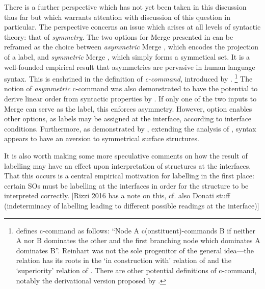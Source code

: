 There is a further perspective which has not yet been taken in this discussion thus far but which warrants attention with discussion of this question in particular. The perspective concerns an issue which arises at all levels of syntactic theory: that of \textit{symmetry}. The two options for Merge presented in  can be reframed as the choice between \textit{asymmetric} Merge , which encodes the projection of a label, and \textit{symmetric} Merge , which simply forms a symmetical set. It is a well-founded empirical result that asymmetries are pervasive in human language syntax. This is enshrined in the definition of \textit{c-command}, introduced by \textcite{ReinhartT_1976}.%
\footnote{\label{fn:c-command}\textcite[32]{ReinhartT_1976} defines c-command as follows: ``Node A c(onstituent)-commands B if neither A nor B dominates the other and the first branching node which dominates A dominates B''. Reinhart was not the sole progenitor of the general idea---the relation has its roots in the `in construction with' relation of \textcite{KlimaES_1964} and the `superiority' relation of \textcite{ChomskyN_1973}. There are other potential definitions of c-command, notably the derivational version proposed by \textcite{EpsteinSD.etal_1998}.}
The notion of \textit{asymmetric} c-command was also demonstrated to have the potential to derive linear order from syntactic properties by \textcite{KayneRS_1994}.
If only one of the two inputs to Merge can serve as the label, this enforces asymmetry. However, option  enables other options, as labels may be assigned at the interface, according to interface conditions. Furthermore, as demonstrated by \textcite{MoroA_2000}, extending the analysis of \textcite{KayneRS_1994}, syntax appears to have an aversion to symmetrical surface structures.

It is also worth making some more speculative comments on how the result of labelling may have an effect upon interpretation of structures at the interfaces. That this occurs is a central empirical motivation for labelling in the first place: certain SOs must be labelling at the interfaces in order for the structure to be interpreted correctly. [Rizzi 2016 has a note on this, cf. also Donati stuff (indeterminacy of labelling leading to different possible readings at the interface)]

